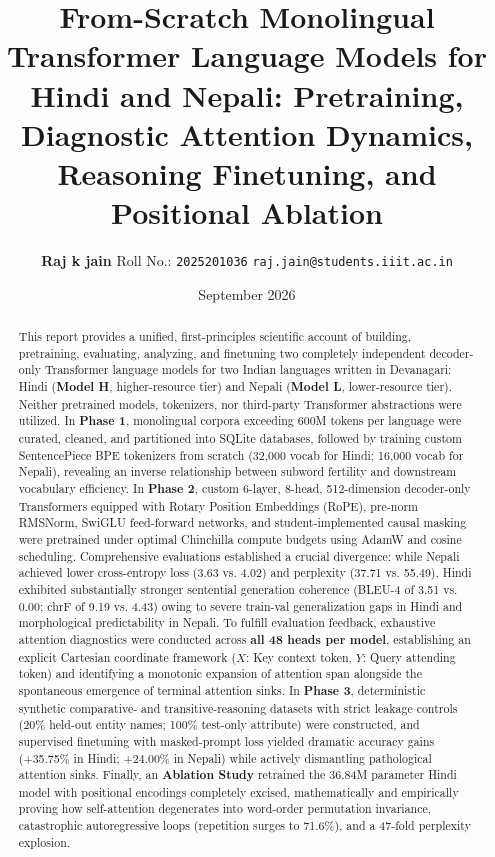 \documentclass[10pt,a4paper]{article}
\title{\vspace{-1.2em}\textbf{\Large From-Scratch Monolingual Transformer Language Models for Hindi and Nepali: Pretraining, Diagnostic Attention Dynamics, Reasoning Finetuning, and Positional Ablation}\vspace{-0.4em}}
\author{\textbf{Raj k jain} \quad\textbullet\quad Roll No.: \texttt{2025201036} \quad\textbullet\quad \texttt{raj.jain@students.iiit.ac.in}\vspace{-0.8em}}
\date{\vspace{-0.6em}\small September 2026}
\begin{document}
\maketitle
\begin{abstract}
\small
This report provides a unified, first-principles scientific account of building, pretraining, evaluating, analyzing, and finetuning two completely independent decoder-only Transformer language models for two Indian languages written in Devanagari: Hindi (\textbf{Model H}, higher-resource tier) and Nepali (\textbf{Model L}, lower-resource tier). Neither pretrained models, tokenizers, nor third-party Transformer abstractions were utilized. In \textbf{Phase 1}, monolingual corpora exceeding 600M tokens per language were curated, cleaned, and partitioned into SQLite databases, followed by training custom SentencePiece BPE tokenizers from scratch (32,000 vocab for Hindi; 16,000 vocab for Nepali), revealing an inverse relationship between subword fertility and downstream vocabulary efficiency. In \textbf{Phase 2}, custom 6-layer, 8-head, 512-dimension decoder-only Transformers equipped with Rotary Position Embeddings (RoPE), pre-norm RMSNorm, SwiGLU feed-forward networks, and student-implemented causal masking were pretrained under optimal Chinchilla compute budgets using AdamW and cosine scheduling. Comprehensive evaluations established a crucial divergence: while Nepali achieved lower cross-entropy loss (3.63 vs. 4.02) and perplexity (37.71 vs. 55.49), Hindi exhibited substantially stronger sentential generation coherence (BLEU-4 of 3.51 vs. 0.00; chrF of 9.19 vs. 4.43) owing to severe train-val generalization gaps in Hindi and morphological predictability in Nepali. To fulfill evaluation feedback, exhaustive attention diagnostics were conducted across \textbf{all 48 heads per model}, establishing an explicit Cartesian coordinate framework ($X$: Key context token, $Y$: Query attending token) and identifying a monotonic expansion of attention span alongside the spontaneous emergence of terminal attention sinks. In \textbf{Phase 3}, deterministic synthetic comparative- and transitive-reasoning datasets with strict leakage controls (20\% held-out entity names; 100\% test-only attribute) were constructed, and supervised finetuning with masked-prompt loss yielded dramatic accuracy gains (+35.75\% in Hindi; +24.00\% in Nepali) while actively dismantling pathological attention sinks. Finally, an \textbf{Ablation Study} retrained the 36.84M parameter Hindi model with positional encodings completely excised, mathematically and empirically proving how self-attention degenerates into word-order permutation invariance, catastrophic autoregressive loops (repetition surges to 71.6\%), and a 47-fold perplexity explosion.
\end{abstract}
\vspace{0.8em}
\end{document}
